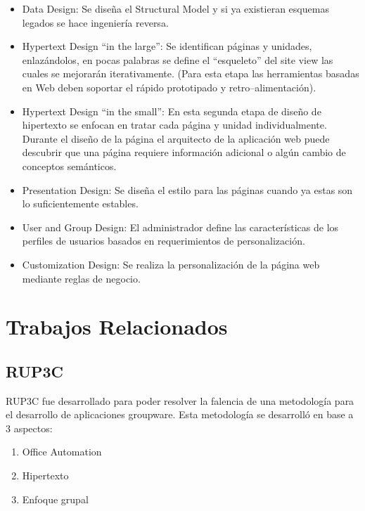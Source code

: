 \documentclass[oneside,12pt,a4paper]{memoir}%
\begin{document}
\begin{itemize}
\begin{itemize}
		  \item Data Design: Se dise\~na el Structural Model y si ya existieran
		  esquemas legados se hace ingenier\'ia reversa.
		  \item Hypertext Design ``in the large'': Se identifican p\'aginas y unidades,
		  enlaz\'andolos, en pocas palabras se define el ``esqueleto'' del site view las
		  cuales se mejorar\'an iterativamente. (Para esta etapa las herramientas
		  basadas en Web deben soportar el r\'apido prototipado y
		  retro--alimentaci\'on).
		  \item Hypertext Design ``in the small'': En esta segunda etapa de dise\~no de
		  hipertexto se enfocan en tratar cada p\'agina y unidad individualmente.
		  Durante el dise\~no de la p\'agina el arquitecto de la aplicaci\'on web puede
		  descubrir que una p\'agina requiere informaci\'on adicional o alg\'un cambio de
		  conceptos sem\'anticos.
		  \item Presentation Design: Se dise\~na el estilo para las p\'aginas cuando ya
		  estas son lo suficientemente estables.
		  \item User and Group Design: El administrador define las caracter\'isticas de
		  los perfiles de usuarios basados en requerimientos de personalizaci\'on.
		  \item Customization Design: Se realiza la personalizaci\'on de la p\'agina
		  web mediante reglas de negocio.
			
		\end{itemize}

	\end{itemize}
	
	\section{Trabajos Relacionados}
	\label{sec:RelatedWorks}	
		\subsection{RUP3C}
		\label{ssec:RUP3C}
		RUP3C fue desarrollado para poder resolver la falencia de una metodolog\'ia para
		el desarrollo de aplicaciones groupware. Esta metodolog\'ia se desarroll\'o en base
		a $3$ aspectos:
		
		\begin{enumerate}
		  \item Office Automation
		  \item Hipertexto
		  \item Enfoque grupal 
		\end{enumerate}
		
\end{document}
